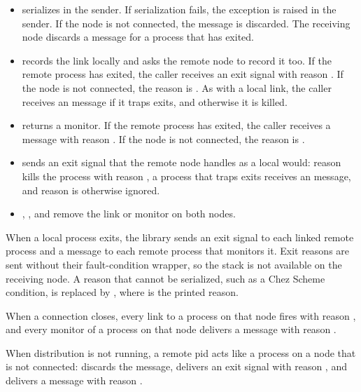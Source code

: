 \begin{itemize}
\item {} serializes 
  in the sender. If serialization fails, the exception is raised in the
  sender. If the node is not connected, the message is discarded. The
  receiving node discards a message for a process that has exited.

\item {} records the link locally and asks the
  remote node to record it too. If the remote process has exited, the
  caller receives an exit signal with reason . If the node
  is not connected, the reason is . As with a local
  link, the caller receives an  message if it traps exits,
  and otherwise it is killed.

\item {} returns a monitor. If the remote
  process has exited, the caller receives a  message with
  reason . If the node is not connected, the reason is
  .

\item {} sends an exit signal that
  the remote node handles as a local  would: reason
   kills the process with reason , a process
  that traps exits receives an  message, and reason
   is otherwise ignored.

\item {}, , and 
  remove the link or monitor on both nodes.
\end{itemize}

When a local process exits, the library sends an exit signal to each
linked remote process and a  message to each remote process
that monitors it. Exit reasons are sent without their fault-condition
wrapper, so the stack is not available on the receiving node. A reason
that cannot be serialized, such as a Chez Scheme condition, is replaced
by , where  is
the printed reason.

When a connection closes, every link to a process on that node fires
with reason , and every monitor of a process on that
node delivers a  message with reason
.

When distribution is not running, a remote pid acts like a process on a
node that is not connected:  discards the message,
 delivers an exit signal with reason , and
 delivers a  message with reason
.


